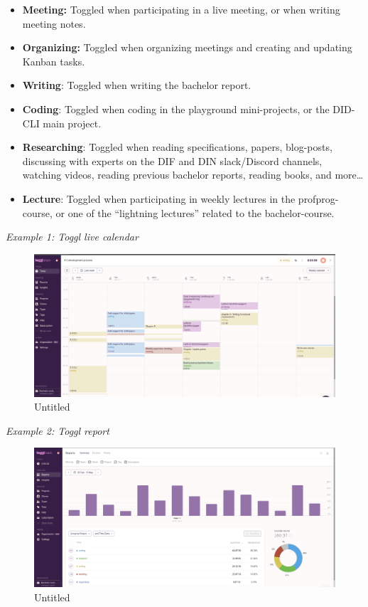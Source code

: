 \begin{itemize}
\tightlist
\item
  \textbf{Meeting:} Toggled when participating in a live meeting, or
  when writing meeting notes.
\item
  \textbf{Organizing:} Toggled when organizing meetings and creating and
  updating Kanban tasks.
\item
  \textbf{Writing}: Toggled when writing the bachelor report.
\item
  \textbf{Coding}: Toggled when coding in the playground mini-projects,
  or the DID-CLI main project.
\item
  \textbf{Researching}: Toggled when reading specifications, papers,
  blog-posts, discussing with experts on the DIF and DIN slack/Discord
  channels, watching videos, reading previous bachelor reports, reading
  books, and more\ldots{}
\item
  \textbf{Lecture}: Toggled when participating in weekly lectures in the
  profprog-course, or one of the ``lightning lectures'' related to the
  bachelor-course.
\end{itemize}

\emph{Example 1: Toggl live calendar}

\begin{figure}
\centering
\includegraphics{Development Process a132dd5987b94adf8fc5989add9afc3f/Untitled 5.png}
\caption{Untitled}
\end{figure}

\emph{Example 2: Toggl report}

\begin{figure}
\centering
\includegraphics{Development Process a132dd5987b94adf8fc5989add9afc3f/Untitled 6.png}
\caption{Untitled}
\end{figure}
